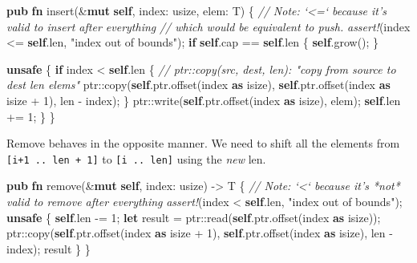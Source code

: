 \documentclass[a4paper,]{book}
\newenvironment{Shaded}{\begin{snugshade}}{\end{snugshade}}
\newcommand{\KeywordTok}[1]{\textcolor[rgb]{0.13,0.29,0.53}{\textbf{{#1}}}}
\newcommand{\DataTypeTok}[1]{\textcolor[rgb]{0.13,0.29,0.53}{{#1}}}
\newcommand{\DecValTok}[1]{\textcolor[rgb]{0.00,0.00,0.81}{{#1}}}
\newcommand{\StringTok}[1]{\textcolor[rgb]{0.31,0.60,0.02}{{#1}}}
\newcommand{\CommentTok}[1]{\textcolor[rgb]{0.56,0.35,0.01}{\textit{{#1}}}}
\newcommand{\PreprocessorTok}[1]{\textcolor[rgb]{0.56,0.35,0.01}{\textit{{#1}}}}
\newcommand{\NormalTok}[1]{{#1}}
\begin{document}
\begin{Shaded}
\begin{Highlighting}[]
\KeywordTok{pub} \KeywordTok{fn} \NormalTok{insert(&}\KeywordTok{mut} \KeywordTok{self}\NormalTok{, index: }\DataTypeTok{usize}\NormalTok{, elem: T) \{}
    \CommentTok{// Note: `<=` because it's valid to insert after everything}
    \CommentTok{// which would be equivalent to push.}
    \PreprocessorTok{assert!}\NormalTok{(index <= }\KeywordTok{self}\NormalTok{.len, }\StringTok{"index out of bounds"}\NormalTok{);}
    \KeywordTok{if} \KeywordTok{self}\NormalTok{.cap == }\KeywordTok{self}\NormalTok{.len \{ }\KeywordTok{self}\NormalTok{.grow(); \}}

    \KeywordTok{unsafe} \NormalTok{\{}
        \KeywordTok{if} \NormalTok{index < }\KeywordTok{self}\NormalTok{.len \{}
            \CommentTok{// ptr::copy(src, dest, len): "copy from source to dest len elems"}
            \NormalTok{ptr::copy(}\KeywordTok{self}\NormalTok{.ptr.offset(index }\KeywordTok{as} \DataTypeTok{isize}\NormalTok{),}
                      \KeywordTok{self}\NormalTok{.ptr.offset(index }\KeywordTok{as} \DataTypeTok{isize} \NormalTok{+ }\DecValTok{1}\NormalTok{),}
                      \NormalTok{len - index);}
        \NormalTok{\}}
        \NormalTok{ptr::write(}\KeywordTok{self}\NormalTok{.ptr.offset(index }\KeywordTok{as} \DataTypeTok{isize}\NormalTok{), elem);}
        \KeywordTok{self}\NormalTok{.len += }\DecValTok{1}\NormalTok{;}
    \NormalTok{\}}
\NormalTok{\}}
\end{Highlighting}
\end{Shaded}

Remove behaves in the opposite manner. We need to shift all the elements
from \texttt{{[}i+1\ ..\ len\ +\ 1{]}} to \texttt{{[}i\ ..\ len{]}}
using the \emph{new} len.

\begin{Shaded}
\begin{Highlighting}[]
\KeywordTok{pub} \KeywordTok{fn} \NormalTok{remove(&}\KeywordTok{mut} \KeywordTok{self}\NormalTok{, index: }\DataTypeTok{usize}\NormalTok{) -> T \{}
    \CommentTok{// Note: `<` because it's *not* valid to remove after everything}
    \PreprocessorTok{assert!}\NormalTok{(index < }\KeywordTok{self}\NormalTok{.len, }\StringTok{"index out of bounds"}\NormalTok{);}
    \KeywordTok{unsafe} \NormalTok{\{}
        \KeywordTok{self}\NormalTok{.len -= }\DecValTok{1}\NormalTok{;}
        \KeywordTok{let} \NormalTok{result = ptr::read(}\KeywordTok{self}\NormalTok{.ptr.offset(index }\KeywordTok{as} \DataTypeTok{isize}\NormalTok{));}
        \NormalTok{ptr::copy(}\KeywordTok{self}\NormalTok{.ptr.offset(index }\KeywordTok{as} \DataTypeTok{isize} \NormalTok{+ }\DecValTok{1}\NormalTok{),}
                  \KeywordTok{self}\NormalTok{.ptr.offset(index }\KeywordTok{as} \DataTypeTok{isize}\NormalTok{),}
                  \NormalTok{len - index);}
        \NormalTok{result}
    \NormalTok{\}}
\NormalTok{\}}
\end{Highlighting}
\end{Shaded}
\end{document}
